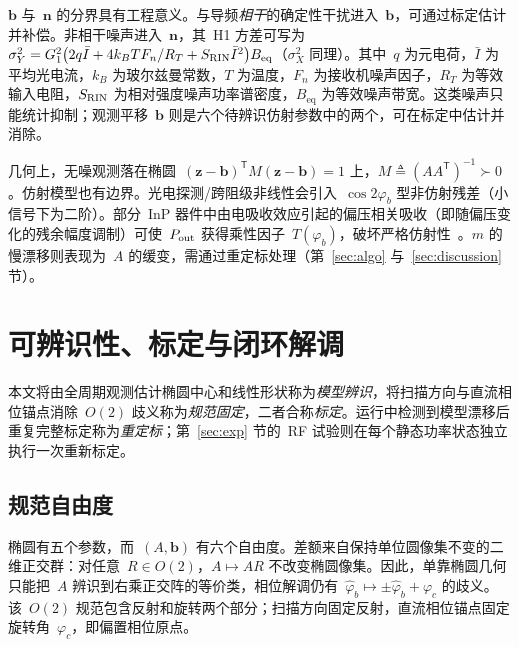 \documentclass[journal]{IEEEtran}
\theoremstyle{plain}
\theoremstyle{remark}
\newcommand{\zv}{\mathbf{z}}
\newcommand{\bv}{\mathbf{b}}
\newcommand{\nv}{\mathbf{n}}
\newcommand{\T}{\mathsf{T}}
\begin{document}
$\bv$ 与~$\nv$ 的分界具有工程意义。与导频\emph{相干}的确定性干扰进入~$\bv$，可通过标定估计并补偿。非相干噪声进入~$\nv$，其~H1 方差可写为
$\sigma_Y^2=G_1^2\bigl(2q\bar I+4k_BT F_n/R_T+S_{\rm RIN}\bar I^2\bigr)B_{\mathrm{eq}}$（$\sigma_X^2$ 同理）。其中~$q$ 为元电荷，$\bar I$ 为平均光电流，$k_B$ 为玻尔兹曼常数，$T$ 为温度，$F_n$ 为接收机噪声因子，$R_T$ 为等效输入电阻，$S_{\rm RIN}$ 为相对强度噪声功率谱密度，$B_{\mathrm{eq}}$ 为等效噪声带宽。这类噪声只能统计抑制；观测平移~$\bv$ 则是六个待辨识仿射参数中的两个，可在标定中估计并消除。

几何上，无噪观测落在椭圆~$(\zv-\bv)^{\T}M(\zv-\bv)=1$ 上，$M\triangleq(AA^{\T})^{-1}\succ0$。仿射模型也有边界。光电探测/跨阻级非线性会引入~$\cos 2\varphi_b$ 型非仿射残差（小信号下为二阶）。部分~InP 器件中由电吸收效应引起的偏压相关吸收（即随偏压变化的残余幅度调制）可使~$P_{\rm out}$ 获得乘性因子~$T(\varphi_b)$，破坏严格仿射性~\cite{chen2011}。$m$ 的慢漂移则表现为~$A$ 的缓变，需通过重定标处理（第~\ref{sec:algo} 与~\ref{sec:discussion} 节）。

\section{可辨识性、标定与闭环解调}
\label{sec:calib}

本文将由全周期观测估计椭圆中心和线性形状称为\emph{模型辨识}，将扫描方向与直流相位锚点消除~$O(2)$ 歧义称为\emph{规范固定}，二者合称\emph{标定}。运行中检测到模型漂移后重复完整标定称为\emph{重定标}；第~\ref{sec:exp} 节的~RF 试验则在每个静态功率状态独立执行一次重新标定。

\subsection{规范自由度}
椭圆有五个参数，而~$(A,\bv)$ 有六个自由度。差额来自保持单位圆像集不变的二维正交群：对任意~$R\in O(2)$，$A\mapsto AR$ 不改变椭圆像集。因此，单靠椭圆几何只能把~$A$ 辨识到右乘正交阵的等价类，相位解调仍有~$\hat\varphi_b\mapsto\pm\hat\varphi_b+\varphi_c$ 的歧义。该~$O(2)$ 规范包含反射和旋转两个部分；扫描方向固定反射，直流相位锚点固定旋转角~$\varphi_c$，即偏置相位原点。
\end{document}
